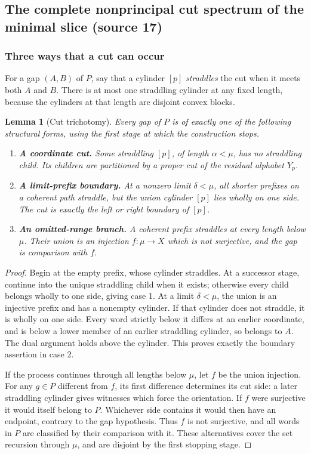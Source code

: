 \documentclass[11pt]{article}
\newtheorem{lemma}[lemma]{Lemma}
\theoremstyle{definition}
\theoremstyle{remark}
\begin{document}
\subsection{The complete nonprincipal cut spectrum of the minimal slice (source 17)}
\label{swo:gs:sec:cuts}

\subsubsection{Three ways that a cut can occur}
For a gap $(A,B)$ of $P$, say that a cylinder $[p]$ \emph{straddles} the
cut when it meets both $A$ and $B$. There is at most one straddling cylinder
at any fixed length, because the cylinders at that length are disjoint
convex blocks.

\begin{lemma}[Cut trichotomy]\label{swo:gs:lem:cut-trichotomy}
Every gap of $P$ is of exactly one of the following structural forms,
using the first stage at which the construction stops.
\begin{enumerate}
\item \textbf{A coordinate cut.} Some straddling $[p]$, of length
$\alpha<\mu$, has no straddling child. Its children are partitioned by a
proper cut of the residual alphabet $Y_p$.
\item \textbf{A limit-prefix boundary.} At a nonzero limit
$\delta<\mu$, all shorter prefixes on a coherent path straddle, but the
union cylinder $[p]$ lies wholly on one side. The cut is exactly the left
or right boundary of $[p]$.
\item \textbf{An omitted-range branch.} A coherent prefix straddles at
every length below $\mu$. Their union is an injection
$f:\mu\to X$ which is not surjective, and the gap is comparison with $f$.
\end{enumerate}
\end{lemma}
\begin{proof}
Begin at the empty prefix, whose cylinder straddles. At a successor stage,
continue into the unique straddling child when it exists; otherwise every
child belongs wholly to one side, giving case 1. At a limit
$\delta<\mu$, the union is an injective prefix and has a nonempty cylinder.
If that cylinder does not straddle, it is wholly on one side. Every word
strictly below it differs at an earlier coordinate, and is below a lower
member of an earlier straddling cylinder, so belongs to $A$. The dual
argument holds above the cylinder. This proves exactly the boundary
assertion in case 2.

If the process continues through all lengths below $\mu$, let $f$ be the
union injection. For any $g\in P$ different from $f$, its first difference
determines its cut side: a later straddling cylinder gives witnesses which
force the orientation. If $f$ were surjective it would itself belong to
$P$. Whichever side contains it would then have an endpoint, contrary to
the gap hypothesis. Thus $f$ is not surjective, and all words in $P$ are
classified by their comparison with it. These alternatives cover the
set recursion through $\mu$, and are disjoint by the first stopping stage.
\end{proof}
\end{document}
